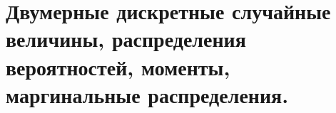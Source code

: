 \documentclass[polytech/stats/exam-2023/stats-exam-2023.tex]{subfiles}
\begin{document}
\section{Двумерные дискретные случайные величины, распределения вероятностей, моменты, маргинальные распределения.}
\end{document}
